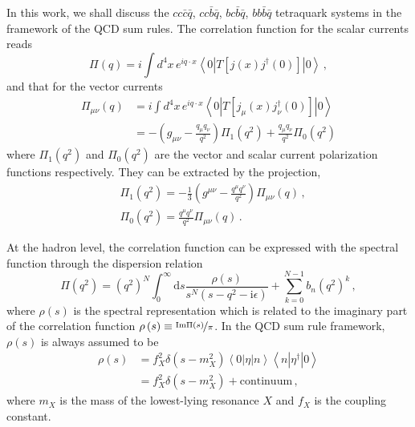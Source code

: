 \documentclass[prd,showpacs,showkeys,floatfix,amsmath,amssymb,floatfix,english]{revtex4}
\begin{document}
In this work, we shall discuss the $cc\bar{c}\bar{q}$,
$cc\bar{b}\bar{q}$, $bc\bar{b}\bar{q}$, $bb\bar{b}\bar{q}$
tetraquark systems in the framework of the QCD sum rules. The
correlation function for the scalar currents reads
\begin{equation}
\Pi\left(q\right)=i\int d^{4}x\,e^{iq\cdot x}\left\langle
0\left|T\left[j\left(x\right)j^{\dagger}\left(0\right)\right]\right|0\right\rangle\,
,
\end{equation}
and that for the vector currents
\begin{align}
\Pi_{\mu\nu}\left(q\right) & =i\int d^{4}x\,e^{iq\cdot x}\left\langle 0\left|T\left[j_{\mu}\left(x\right)j_{\nu}^{\dagger}\left(0\right)\right]\right|0\right\rangle \nonumber \\
 & =-\left(g_{\mu\nu}-\frac{q_{\mu}q_{\nu}}{q^{2}}\right)\Pi_{1}\left(q^{2}\right)+\frac{q_{\mu}q_{\nu}}{q^{2}}\Pi_{0}\left(q^{2}\right)
\end{align}
where $\Pi_{1}\left(q^{2}\right)$ and $\Pi_{0}\left(q^{2}\right)$
are the vector and scalar current polarization functions
respectively. They can be extracted by the projection,
\begin{align}
 & \Pi_{1}\left(q^{2}\right)=-\frac{1}{3}\left(g^{\mu\nu}-\frac{q^{\mu}q^{\nu}}{q^{2}}\right)\Pi_{\mu\nu}\left(q\right)\, ,\\
 & \Pi_{0}\left(q^{2}\right)=\frac{q^{\mu}q^{\nu}}{q^{2}}\Pi_{\mu\nu}\left(q\right)\, .
\end{align}

At the hadron level, the correlation function can be expressed with
the spectral function through the dispersion relation
\begin{equation}
\Pi\left(q^{2}\right)=\left(q^{2}\right)^{N}\int_{0}^{\infty}\mathrm{d}s\frac{\rho\left(s\right)}{s^{N}\left(s-q^{2}-\mathrm{i}\epsilon\right)}+\sum_{k=0}^{N-1}b_{n}\left(q^{2}\right)^{k}\,
, \label{eq:dispersion relation}
\end{equation}
where $\rho\left(s\right)$ is the spectral representation which is
related to the imaginary part of the correlation function
$\rho\left(s\right)\equiv\nicefrac{\mathrm{Im}\Pi\left(s\right)}{\pi}$.
In the QCD sum rule framework, $\rho\left(s\right)$ is always
assumed to be
\begin{align}
\rho\left(s\right) & =f_{X}^{2}\delta\left(s-m_{X}^{2}\right)\left\langle 0\left|\eta\right|n\right\rangle \left\langle n\left|\eta^{\dagger}\right|0\right\rangle \nonumber \\
 & =f_{X}^{2}\delta\left(s-m_{X}^{2}\right)+\text{continuum}\, ,
\end{align}
where $m_{X}$ is the mass of the lowest-lying resonance $X$ and
$f_{X}$ is the coupling constant.
\end{document}
